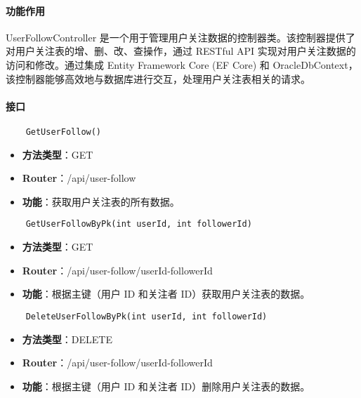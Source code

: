 \paragraph{功能作用}

UserFollowController 是一个用于管理用户关注数据的控制器类。该控制器提供了对用户关注表的增、删、改、查操作，通过 RESTful API 实现对用户关注数据的访问和修改。通过集成 Entity Framework Core (EF Core) 和 OracleDbContext，该控制器能够高效地与数据库进行交互，处理用户关注表相关的请求。

\paragraph{接口}

\begin{verbatim}
	GetUserFollow()
\end{verbatim}

\begin{itemize}
	\item \textbf{方法类型}：GET
	\item \textbf{Router}：/api/user-follow
	\item \textbf{功能}：获取用户关注表的所有数据。
\end{itemize}

\begin{verbatim}
	GetUserFollowByPk(int userId, int followerId)
\end{verbatim}

\begin{itemize}
	\item \textbf{方法类型}：GET
	\item \textbf{Router}：/api/user-follow/{userId}-{followerId}
	\item \textbf{功能}：根据主键（用户 ID 和关注者 ID）获取用户关注表的数据。
\end{itemize}

\begin{verbatim}
	DeleteUserFollowByPk(int userId, int followerId)
\end{verbatim}

\begin{itemize}
	\item \textbf{方法类型}：DELETE
	\item \textbf{Router}：/api/user-follow/{userId}-{followerId}
	\item \textbf{功能}：根据主键（用户 ID 和关注者 ID）删除用户关注表的数据。
\end{itemize}

